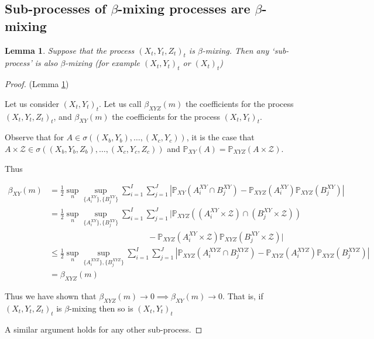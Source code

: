 \documentclass[]{article}
\newtheorem{lemma}{Lemma}
\begin{document}
\subsection{Sub-processes of $\beta$-mixing processes are $\beta$-mixing}\label{supp:lemma-beta}
\begin{lemma}\label{lemma:beta}
Suppose that the process $(X_t,Y_t,Z_t)_t$ is $\beta$-mixing. Then any `sub-process' is also $\beta$-mixing (for example $(X_t,Y_t)_t$ or $(X_t)_t$)
\end{lemma}
\begin{proof}(Lemma \ref{lemma:beta}) 

Let us consider $(X_t,Y_t)_t$.
Let us call $\beta_{XYZ}(m)$ the coefficients for the process $(X_t,Y_t,Z_t)_t$, and $\beta_{XY}(m)$ the coefficients for the process $(X_t,Y_t)_t$. 

Observe that for $A \in \sigma((X_b,Y_b),\ldots, (X_c,Y_c))$, it is the case that $A \times \mathcal{Z} \in \sigma((X_b,Y_b,Z_b),\ldots, (X_c,Y_c,Z_c))$ and $\mathbb{P}_{XY}(A) = \mathbb{P}_{XYZ}(A\times \mathcal{Z})$.

Thus

\begin{align*}
\beta_{XY}(m) &= \frac{1}{2} \sup_n \sup_{ \{A_i^{XY} \}, \{B_j^{XY} \} } \sum_{i=1}^I \sum_{j=1}^J | \mathbb{P}_{XY}(A_i^{XY} \cap B_j^{XY}) - \mathbb{P}_{XYZ}(A_i^{XY})\mathbb{P}_{XYZ}(B_j^{XY})| \\
&= \frac{1}{2} \sup_n \sup_{ \{A_i^{XY} \}, \{B_j^{XY} \} } \sum_{i=1}^I \sum_{j=1}^J | \mathbb{P}_{XYZ}((A_i^{XY}\times \mathcal{Z}) \cap (B_j^{XY} \times \mathcal{Z})) \\& \quad \quad\quad \quad \quad \quad\quad \quad \quad \quad\quad \quad- \mathbb{P}_{XYZ}(A_i^{XY}\times \mathcal{Z})\mathbb{P}_{XYZ}(B_j^{XY} \times \mathcal{Z})| \\
& \leq \frac{1}{2} \sup_n \sup_{ \{A_i^{XYZ} \}, \{B_j^{XYZ} \} } \sum_{i=1}^I \sum_{j=1}^J | \mathbb{P}_{XYZ}(A_i^{XYZ} \cap B_j^{XYZ}) - \mathbb{P}_{XYZ}(A_i^{XYZ})\mathbb{P}_{XYZ}(B_j^{XYZ})| \\
& = \beta_{XYZ}(m)
\end{align*}

Thus we have shown that  $\beta_{XYZ}(m) \longrightarrow 0 \implies \beta_{XY}(m) \longrightarrow 0$. That is, if  $(X_t,Y_t,Z_t)_t$ is $\beta$-mixing then so is  $(X_t,Y_t)_t$ 

A similar argument holds for any other sub-process.
\end{proof}
\end{document}
